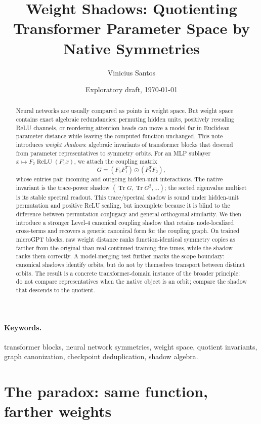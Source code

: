\documentclass[11pt]{article}
\title{\vspace{-1.5em}\textbf{Weight Shadows: Quotienting Transformer Parameter Space by Native Symmetries}}
\author{Vinicius Santos}
\date{Exploratory draft, \today}
\newcommand{\Tr}{\operatorname{Tr}}
\newcommand{\relu}{\operatorname{ReLU}}
\newcommand{\Had}{\odot}
\begin{document}
\maketitle

\begin{abstract}
Neural networks are usually compared as points in weight space. But weight space contains exact algebraic redundancies: permuting hidden units, positively rescaling ReLU channels, or reordering attention heads can move a model far in Euclidean parameter distance while leaving the computed function unchanged. This note introduces \emph{weight shadows}: algebraic invariants of transformer blocks that descend from parameter representatives to symmetry orbits. For an MLP sublayer $x\mapsto F_2\relu(F_1x)$, we attach the coupling matrix
\[
G=(F_1F_1^T)\Had(F_2^TF_2),
\]
whose entries pair incoming and outgoing hidden-unit interactions. The native invariant is the trace-power shadow $(\Tr G,\Tr G^2,\ldots)$; the sorted eigenvalue multiset is its stable spectral readout. This trace/spectral shadow is sound under hidden-unit permutation and positive ReLU scaling, but incomplete because it is blind to the difference between permutation conjugacy and general orthogonal similarity. We then introduce a stronger Level-4 canonical coupling shadow that retains node-localized cross-terms and recovers a generic canonical form for the coupling graph. On trained microGPT blocks, raw weight distance ranks function-identical symmetry copies as farther from the original than real continued-training fine-tunes, while the shadow ranks them correctly. A model-merging test further marks the scope boundary: canonical shadows identify orbits, but do not by themselves transport between distinct orbits. The result is a concrete transformer-domain instance of the broader principle: do not compare representatives when the native object is an orbit; compare the shadow that descends to the quotient.
\end{abstract}

\paragraph{Keywords.} transformer blocks, neural network symmetries, weight space, quotient invariants, graph canonization, checkpoint deduplication, shadow algebra.

\section{The paradox: same function, farther weights}
\end{document}
